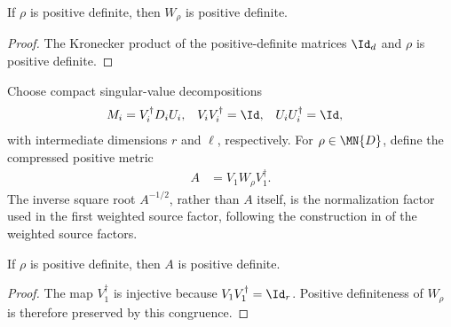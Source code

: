 \begin{lemma}
    \label{thm:mpu_source_weight_posdef}
    \leanok
    If $\rho$ is positive definite, then $W_\rho$ is positive definite.
\end{lemma}

\begin{proof}
    \leanok
    The Kronecker product of the positive-definite matrices $\Id_d$ and
    $\rho$ is positive definite.
\end{proof}

\begin{definition}
    \label{def:mpu_source_svd_data}
    \leanok
    Choose compact singular-value decompositions
    \begin{align}
        M_i & =V_i^\dagger D_iU_i,
            & V_iV_i^\dagger       & =\Id,
            & U_iU_i^\dagger       & =\Id,
    \end{align}
    with intermediate dimensions $r$ and $\ell$, respectively. For
    $\rho\in\MN{D}$, define the compressed positive metric
    \begin{align}
        A & =V_1W_\rho V_1^\dagger.
    \end{align}
    The inverse square root $A^{-1/2}$, rather than $A$ itself, is the
    normalization factor used in the first weighted source factor, following the
    construction in \cite[Section~III]{Cirac2017MPU} of the weighted source factors.
\end{definition}

\begin{lemma}
    \label{thm:mpu_source_gram_posdef}
    \leanok
    If $\rho$ is positive definite, then $A$ is positive definite.
\end{lemma}

\begin{proof}
    \leanok
    The map $V_1^\dagger$ is injective because $V_1V_1^\dagger=\Id_r$.
    Positive definiteness of $W_\rho$ is therefore preserved by this
    congruence.
\end{proof}

